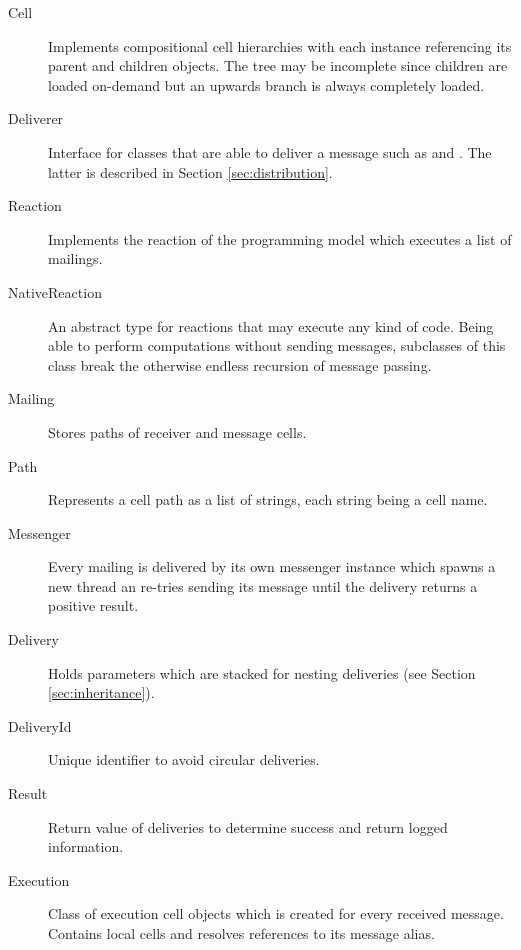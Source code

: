 
\begin{description}
\item[Cell]{Implements compositional cell hierarchies with each instance referencing its parent and children objects. The tree may be incomplete since children are loaded on-demand but an upwards branch is always completely loaded.}

\item[Deliverer]{Interface for classes that are able to deliver a message such as  and . The latter is described in Section \ref{sec:distribution}.}

\item[Reaction]{Implements the reaction of the programming model which executes a list of mailings.}

\item[NativeReaction]{An abstract type for reactions that may execute any kind of code. Being able to perform computations without sending messages, subclasses of this class break the otherwise endless recursion of message passing.}

\item[Mailing]{Stores paths of receiver and message cells.}

\item[Path]{Represents a cell path as a list of strings, each string being a cell name.}

\item[Messenger]{Every mailing is delivered by its own messenger instance which spawns a new thread an re-tries sending its message until the delivery returns a positive result.}

\item[Delivery]{Holds parameters which are stacked for nesting deliveries (see Section \ref{sec:inheritance}).}

\item[DeliveryId]{Unique identifier to avoid circular deliveries.}

\item[Result]{Return value of deliveries to determine success and return logged information.}

\item[Execution]{Class of execution cell objects which is created for every received message. Contains local cells and resolves references to its message alias.}

\end{description}

